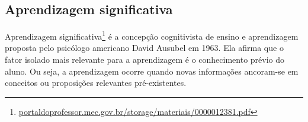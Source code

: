 \subsection{Aprendizagem significativa}

Aprendizagem significativa\footnote{\url{portaldoprofessor.mec.gov.br/storage/materiais/0000012381.pdf}} é a concepção cognitivista de ensino e aprendizagem proposta pelo psicólogo americano David Ausubel em 1963.
Ela afirma que o fator isolado mais relevante para a aprendizagem é o conhecimento prévio do aluno.
Ou seja, a aprendizagem ocorre quando novas informações ancoram-se em conceitos ou proposições relevantes pré-existentes.


